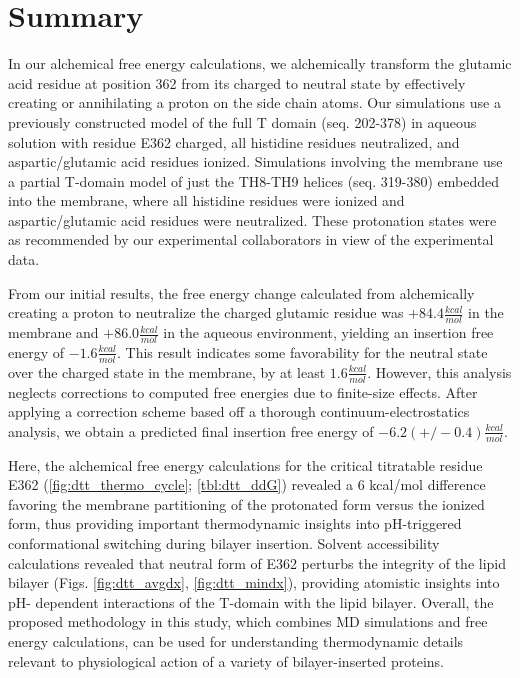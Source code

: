 \section{Summary}
In our alchemical free energy calculations, we alchemically transform the glutamic acid residue at position 362 from its charged to neutral state by effectively creating or annihilating a proton on the side chain atoms.
Our simulations use a previously constructed model of the full T domain (seq. 202-378) in aqueous solution with residue E362 charged, all histidine residues neutralized, and aspartic/glutamic acid residues ionized. 
Simulations involving the membrane use a partial T-domain model of just the TH8-TH9 helices (seq. 319-380) embedded into the membrane, where all histidine residues were ionized and aspartic/glutamic acid residues were neutralized.
These protonation states were as recommended by our experimental collaborators in view of the experimental data.

From our initial results, the free energy change calculated from alchemically creating a proton to neutralize the charged glutamic residue was $+84.4\frac{kcal}{mol}$ in the membrane and $+86.0\frac{kcal}{mol}$ in the aqueous environment, yielding an insertion free energy of $-1.6\frac{kcal}{mol}$.
This result indicates some favorability for the neutral state over the charged state in the membrane, by at least $1.6\frac{kcal}{mol}$.
However, this analysis neglects corrections to computed free energies due to finite-size effects.
After applying a correction scheme based off a thorough continuum-electrostatics analysis\cite{rocklin2013calculating}, we obtain a predicted final insertion free energy of $-6.2 (+/-0.4)\frac{kcal}{mol}$.

Here, the alchemical free energy calculations for the critical titratable residue E362 (\ref{fig:dtt_thermo_cycle}; \ref{tbl:dtt_ddG}) revealed a 6 kcal/mol difference favoring the membrane partitioning of the protonated form versus the ionized form, thus providing important thermodynamic insights into pH-triggered conformational switching during bilayer insertion.
Solvent accessibility calculations revealed that neutral form of E362 perturbs the integrity of the lipid bilayer (Figs. \ref{fig:dtt_avgdx}, \ref{fig:dtt_mindx}), providing atomistic insights into pH- dependent interactions of the T-domain with the lipid bilayer. 
Overall, the proposed methodology in this study, which combines MD simulations and free energy calculations, can be used for understanding thermodynamic details relevant to physiological action of a variety of bilayer-inserted proteins.